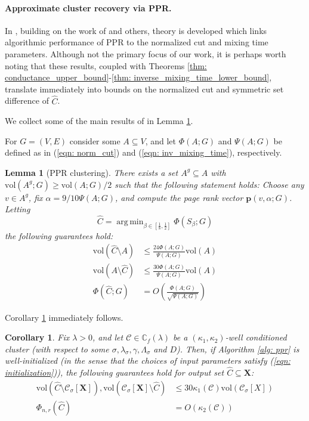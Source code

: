 \documentclass{article}
\newcommand{\vol}{\mathrm{vol}}
\newcommand{\1}{\mathbf{1}}
\newcommand{\pbf}{\mathbf{p}}
\newcommand{\Xbf}{\mathbf{X}}
\newcommand{\Cbb}{\mathbb{C}}
\newcommand{\Cset}{\mathcal{C}}
\newcommand{\Csig}{\Cset_{\sigma}}
\DeclareMathOperator*{\argmin}{arg\,min}
\theoremstyle{aldenthm}
\newtheorem{lemma}{Lemma}
\newtheorem{corollary}{Corollary}
\theoremstyle{aldenrmrk}
\begin{document}
\paragraph{Approximate cluster recovery via PPR.}

In \cite{zhu2013}, building on the work of \cite{andersen2006} and others, theory is developed which links algorithmic performance of PPR to the normalized cut and mixing time parameters. Although not the primary focus of our work, it is perhaps worth noting that these results, coupled with Theorems \ref{thm: conductance_upper_bound}-\ref{thm: inverse_mixing_time_lower_bound}, translate immediately into bounds on the normalized cut and symmetric set difference of $\widehat{C}$.  

We collect some of the main results of \cite{zhu2013} in Lemma \ref{lem: ppr_cluster}.

For $G = (V,E)$ consider some $A \subseteq V$, and let $\Phi(A; G)$ and $\Psi(A; G)$ be defined as in (\ref{eqn: norm_cut}) and (\ref{eqn: inv_mixing_time}), respectively.
\begin{lemma}[PPR clustering]
	\label{lem: ppr_cluster}
	There exists a set $A^g \subseteq A$ with $\vol(A^g;G) \geq \vol(A;G)/2$ such that the following statement holds: Choose any $v \in A^g$, fix $\alpha = 9 / 10 \Psi(A; G)$, and compute the page rank vector $\pbf(v,\alpha; G)$. Letting 
	\begin{equation*}
	\widehat{C} = \argmin_{\beta \in [\frac{1}{8}, \frac{1}{2}]} \Phi(S_{\beta}; G)
	\end{equation*}
	the following guarantees hold:
	\begin{align*}
	\vol(\widehat{C} \setminus A) & \leq \frac{24 \Phi(A; G)}{\Psi(A; G)} \vol(A) \\
	\vol(A \setminus \widehat{C})  & \leq \frac{30 \Phi(A; G)}{\Psi(A; G)} \vol(A) \\
	\Phi(\widehat{C}; G) & = O\left(\frac{\Phi(A; G)}{\sqrt{\Psi(A; G)}}\right)
	\end{align*}
\end{lemma}

Corollary \ref{cor: ppr_cluster} immediately follows.
\begin{corollary}
	\label{cor: ppr_cluster}
	Fix $\lambda > 0$, and let $\Cset \in \Cbb_f(\lambda)$ be a $(\kappa_1,\kappa_2)$-well conditioned cluster (with respect to some $\sigma, \lambda_{\sigma}, \gamma, \Lambda_{\sigma}$ and $D$). Then, if Algorithm \ref{alg: ppr} is well-initialized (in the sense that the choices of input parameters satisfy (\ref{eqn: initialization})), the following guarantees hold for output set $\widehat{C} \subseteq \Xbf$:
	\begin{align*}
	\vol(\widehat{C} \setminus \Csig[\Xbf]), \vol(\Csig[\Xbf] \setminus \widehat{C})  & \leq 30 \kappa_1(\Cset) \vol(\Csig[X]) \\
	\Phi_{n,r}(\widehat{C}) & = O\left(\kappa_2(\Cset)\right)
	\end{align*}
\end{corollary} 
\end{document}
